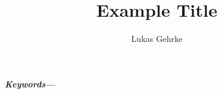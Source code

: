 \documentclass{article}
\title{Example Title}
\author{Lukas Gehrke}
\affil{TU Berlin, Germany}
\providecommand{\keywords}[1]
{
  \small	
  \textbf{\textit{Keywords---}} #1
}
\begin{document}
\maketitle

\begin{abstract}

\end{abstract}
\keywords{}








 

\end{document}
